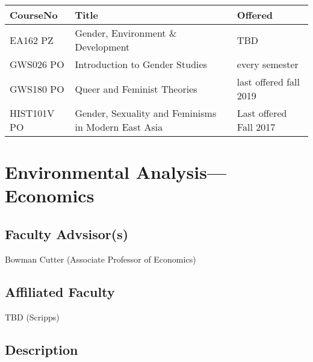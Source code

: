 \documentclass{article}\usepackage[]{graphicx}\usepackage[]{xcolor}
\newenvironment{itemize*}%
  {\begin{itemize}%
    \setlength{\itemsep}{0pt}%
    \setlength{\parskip}{0pt}}%
  {\end{itemize}}
\begin{document}
\begin{description}
\begin{table}[ht]
\centering
\begin{tabular}{lll}
  \hline
CourseNo & Title & Offered \\ 
  \hline
EA162 PZ & Gender, Environment \& Development & TBD \\ 
  GWS026 PO & Introduction to Gender Studies & every semester \\ 
  GWS180 PO & Queer and Feminist Theories & last offered fall 2019 \\ 
  HIST101V PO & Gender, Sexuality and Feminisms in Modern East Asia & Last offered Fall 2017 \\ 
   \hline
\end{tabular}
\end{table}


\end{description}


\newpage
\section{Environmental Analysis---Economics}



\subsection{Faculty Advsisor(s)}

\begin{itemize*}
  \item Bowman Cutter (Associate Professor of Economics)
\end{itemize*}

\subsection{Affiliated Faculty}

\begin{itemize*}
  \item TBD (Scripps)
\end{itemize*}

\subsection{Description}
\end{document}
